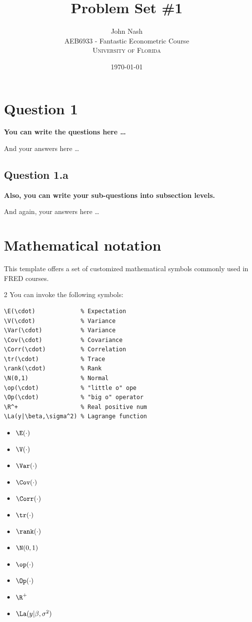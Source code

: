 \documentclass[12pt]{article}
\title{Problem Set \#1} %
\author{John Nash\\ %
AEB6933 - Fantastic Econometric Course\\ %
\textsc{University of Florida}
}
\date{\today} %
\begin{document}
\setlength{\droptitle}{-5em}    
\maketitle


\section*{Question 1}
{\bfseries You can write the questions here \ldots}

And your answers here \ldots

\subsection*{Question 1.a}
{\bfseries Also, you can write your sub-questions into subsection levels.}

And again, your answers here \ldots

\section*{Mathematical notation}

This template offers a set of customized mathematical symbols commonly used in FRED courses.

\begin{multicols}{2}
You can invoke the following symbols:
\begin{Verbatim}[frame=single, fontsize=\footnotesize]
\E(\cdot)             % Expectation
\V(\cdot)             % Variance
\Var(\cdot)           % Variance
\Cov(\cdot)           % Covariance
\Corr(\cdot)          % Correlation
\tr(\cdot)            % Trace
\rank(\cdot)          % Rank
\N(0,1)               % Normal
\op(\cdot)            % "little o" ope
\Op(\cdot)            % "big o" operator
\R^+                  % Real positive num
\La(y|\beta,\sigma^2) % Lagrange function
\end{Verbatim}
\footnotesize{
\begin{itemize}  \setlength\itemsep{0em}
    \item $\E(\cdot)$
    \item $\V(\cdot)$
    \item $\Var(\cdot)$
    \item $\Cov(\cdot)$
    \item $\Corr(\cdot)$
    \item $\tr(\cdot)$
    \item $\rank(\cdot)$
    \item $\N(0,1)$
    \item $\op(\cdot)$
    \item $\Op(\cdot)$
    \item $\R^{+}$
    \item $\La(y|\beta,\sigma^2)$
\end{itemize}}
\end{multicols}
\end{document}
